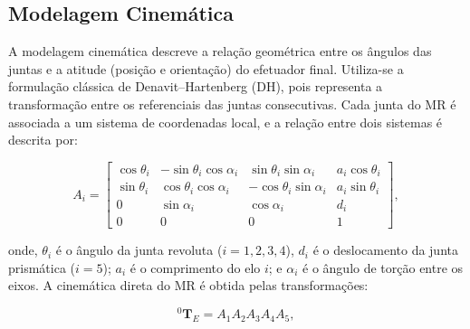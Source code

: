 \subsection{Modelagem Cinemática}
\label{sec:modelagem_cinematica}

A modelagem cinemática descreve a relação geométrica entre os ângulos das juntas e a atitude (posição e orientação) do efetuador final. Utiliza-se a formulação clássica de Denavit--Hartenberg (DH), pois representa a transformação entre os referenciais das juntas consecutivas.
Cada junta do MR é associada a um sistema de coordenadas local, e a relação entre dois sistemas é descrita por:

\begin{equation}
A_i =
\begin{bmatrix}
\cos\theta_i & -\sin\theta_i \cos\alpha_i & \sin\theta_i \sin\alpha_i & a_i \cos\theta_i \\
\sin\theta_i & \cos\theta_i \cos\alpha_i & -\cos\theta_i \sin\alpha_i & a_i \sin\theta_i \\
0 & \sin\alpha_i & \cos\alpha_i & d_i \\
0 & 0 & 0 & 1
\end{bmatrix},
\end{equation}

onde, $\theta_i$ é o ângulo da junta revoluta ($i = 1,2,3,4$), $d_i$ é o deslocamento da junta prismática ($i = 5$); $a_i$ é o comprimento do elo $i$; e $\alpha_i$ é o ângulo de torção entre os eixos.
A cinemática direta do MR é obtida pelas transformações:

\begin{equation}
    \label{eq:matrizes_homogeneas_sucessivas}
{}^0 \mathbf{T}_{E} = A_1 A_2 A_3 A_4 A_5,
\end{equation}

